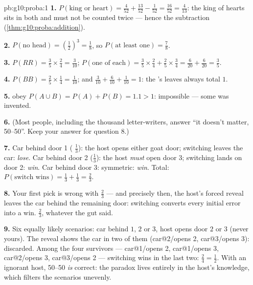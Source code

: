 \begin{solution}{pb:g10:proba:1}
\textbf{1.} $P(\text{king or heart}) = \frac{4}{52} +
\frac{13}{52} - \frac{1}{52} = \frac{16}{52} = \frac{4}{13}$:
the king of hearts sits in both  and must not be counted
twice --- hence the subtraction
(\cref{thm:g10:proba:addition}).

\textbf{2.} $P(\text{no head}) = \left(\frac12\right)^3 =
\frac18$, so $P(\text{at least one}) = \frac78$.

\textbf{3.} $P(RR) = \frac35 \times \frac24 = \frac{3}{10}$;
$P(\text{one of each}) = \frac35 \times \frac24 + \frac25
\times \frac34 = \frac{6}{20} + \frac{6}{20} = \frac35$.

\textbf{4.} $P(BB) = \frac25 \times \frac14 = \frac1{10}$; and
$\frac{3}{10} + \frac{6}{10} + \frac{1}{10} = 1$: the 's
leaves always total $1$.

\textbf{5.}   obey $P(A \cup B) = P(A) +
P(B) = 1.1 > 1$: impossible --- some  was invented.

\textbf{6.} (Most people, including the thousand letter-writers,
answer ``it doesn't matter, 50--50''. Keep your answer for
question 8.)

\textbf{7.} Car behind door 1 ( $\frac13$): the host
opens either goat door; switching leaves the car: \emph{lose}.
Car behind door 2 ($\frac13$): the host \emph{must} open door 3;
switching lands on door 2: \emph{win}. Car behind door 3:
symmetric: \emph{win}. Total:
$P(\text{switch wins}) = \frac13 + \frac13 = \frac23$.

\textbf{8.} Your first pick is wrong with 
$\frac23$ --- and precisely then, the host's forced reveal
leaves the car behind the remaining door: switching converts
every initial error into a win. $\frac23$, whatever the gut
said.

\textbf{9.} Six equally likely scenarios: car behind $1$, $2$
or $3$, host opens door $2$ or $3$ (never yours). The reveal
shows the car in two of them (car@2/opens 2, car@3/opens 3):
discarded. Among the four survivors --- car@1/opens 2,
car@1/opens 3, car@2/opens 3, car@3/opens 2 --- switching wins
in the last two: $\frac24 = \frac12$. With an ignorant host,
50--50 \emph{is} correct: the paradox lives entirely in the
host's knowledge, which filters the scenarios unevenly.


\end{solution}
